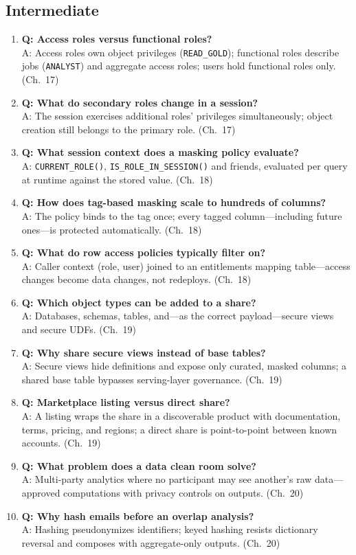\subsection{Intermediate}
\begin{enumerate}
    \item \textbf{Q: Access roles versus functional roles?}\\
    A: Access roles own object privileges (\texttt{READ\_GOLD}); functional roles describe jobs (\texttt{ANALYST}) and aggregate access roles; users hold functional roles only. (Ch.~17)
    \item \textbf{Q: What do secondary roles change in a session?}\\
    A: The session exercises additional roles' privileges simultaneously; object creation still belongs to the primary role. (Ch.~17)
    \item \textbf{Q: What session context does a masking policy evaluate?}\\
    A: \texttt{CURRENT\_ROLE()}, \texttt{IS\_ROLE\_IN\_SESSION()} and friends, evaluated per query at runtime against the stored value. (Ch.~18)
    \item \textbf{Q: How does tag-based masking scale to hundreds of columns?}\\
    A: The policy binds to the tag once; every tagged column---including future ones---is protected automatically. (Ch.~18)
    \item \textbf{Q: What do row access policies typically filter on?}\\
    A: Caller context (role, user) joined to an entitlements mapping table---access changes become data changes, not redeploys. (Ch.~18)
    \item \textbf{Q: Which object types can be added to a share?}\\
    A: Databases, schemas, tables, and---as the correct payload---secure views and secure UDFs. (Ch.~19)
    \item \textbf{Q: Why share secure views instead of base tables?}\\
    A: Secure views hide definitions and expose only curated, masked columns; a shared base table bypasses serving-layer governance. (Ch.~19)
    \item \textbf{Q: Marketplace listing versus direct share?}\\
    A: A listing wraps the share in a discoverable product with documentation, terms, pricing, and regions; a direct share is point-to-point between known accounts. (Ch.~19)
    \item \textbf{Q: What problem does a data clean room solve?}\\
    A: Multi-party analytics where no participant may see another's raw data---approved computations with privacy controls on outputs. (Ch.~20)
    \item \textbf{Q: Why hash emails before an overlap analysis?}\\
    A: Hashing pseudonymizes identifiers; keyed hashing resists dictionary reversal and composes with aggregate-only outputs. (Ch.~20)
\end{enumerate}

